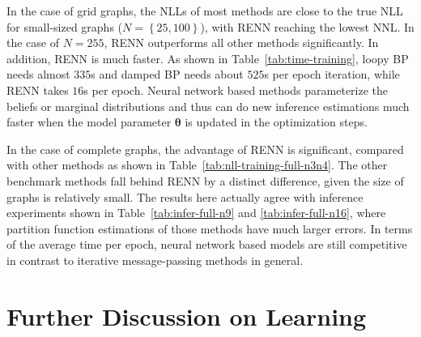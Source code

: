 In the case of grid graphs, the NLLs of most methods are close to the true NLL for small-sized graphs ($N=\left\{ 25, 100 \right\}$), with RENN reaching the lowest NNL. In the case of $N=255$, RENN outperforms all other methods significantly. In addition, RENN is much faster. As shown in Table~\ref{tab:time-training}, loopy BP needs almost $335$s and damped BP needs about $525$s per epoch iteration, while RENN takes $16$s per epoch.
Neural network based methods parameterize the beliefs or marginal distributions and thus can do new inference estimations much faster when the model parameter $\bm{\theta}$ is updated in the optimization steps. 



In the case of complete graphs, the advantage of RENN is significant, compared with other methods as shown in Table~\ref{tab:nll-training-full-n3n4}. The other benchmark methods fall behind RENN by a distinct difference, given the size of graphs is relatively small. The results here actually agree with inference experiments shown in Table~\ref{tab:infer-full-n9} and \ref{tab:infer-full-n16}, where partition function estimations of those methods have much larger errors. In terms of the average time per epoch, neural network based models are still competitive in contrast to iterative message-passing methods in general.


\section{Further Discussion on Learning}\label{chpt5:sec:futher-dis-learning}

